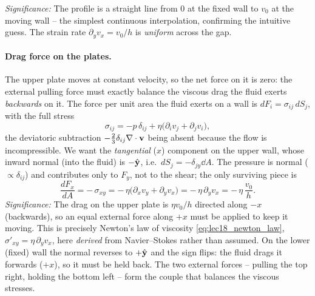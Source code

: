 \documentclass[../main.tex]{subfiles}
\begin{document}
\textit{Significance:} The profile is a straight line from $0$ at the fixed wall to $v_0$ at the moving wall -- the simplest continuous interpolation, confirming the intuitive guess. The strain rate $\partial_y v_x=v_0/h$ is \emph{uniform} across the gap.

\paragraph{Drag force on the plates.} The upper plate moves at constant velocity, so the net force on it is zero: the external pulling force must exactly balance the viscous drag the fluid exerts \emph{backwards} on it. The force per unit area the fluid exerts on a wall is $dF_i=\sigma_{ij}\,dS_j$, with the full stress
\begin{equation}
  \sigma_{ij}=-p\,\delta_{ij}+\eta\big(\partial_i v_j+\partial_j v_i\big),
  \label{eq:lec19_couette_stress}
\end{equation}
the deviatoric subtraction $-\tfrac23\delta_{ij}\nabla \cdot\mathbf{v}$ being absent because the flow is incompressible. We want the \emph{tangential} ($x$) component on the upper wall, whose inward normal (into the fluid) is $-\hat{\mathbf{y}}$, i.e.\ $dS_j=-\delta_{jy}\dd{A}$. The pressure is normal ($\propto\delta_{ij}$) and contributes only to $F_y$, not to the shear; the only surviving piece is
\begin{equation}
  \frac{dF_x}{dA} = -\,\sigma_{xy}
    = -\,\eta\big(\partial_x v_y+\partial_y v_x\big)
    = -\,\eta\,\partial_y v_x = -\,\eta\,\frac{v_0}{h}.
  \label{eq:lec19_couette_drag}
\end{equation}
\textit{Significance:} The drag on the upper plate is $\eta v_0/h$ directed along $-x$ (backwards), so an equal external force along $+x$ must be applied to keep it moving. This is precisely Newton's law of viscosity \eqref{eq:lec18_newton_law}, $\sigma'_{xy}=\eta\,\partial_y v_x$, here \emph{derived} from Navier--Stokes rather than assumed. On the lower (fixed) wall the normal reverses to $+\hat{\mathbf{y}}$ and the sign flips: the fluid drags it forwards ($+x$), so it must be held back. The two external forces -- pulling the top right, holding the bottom left -- form the couple that balances the viscous stresses.

\end{document}
